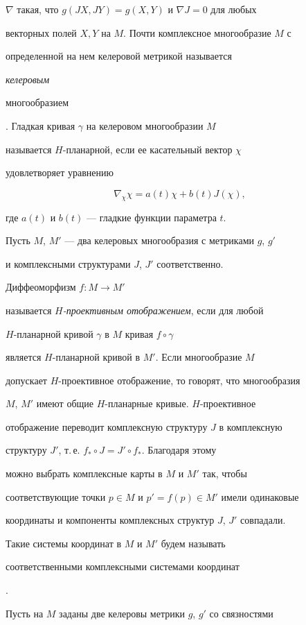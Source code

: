 $\nabla$ такая, что $g(JX,JY)=g(X,Y)$ и $\nabla J=0$ для любых


векторных полей $X,Y$ на $M$. Почти комплексное многообразие $M$ с


определенной на нем келеровой метрикой называется {\it келеровым


многообразием}. Гладкая кривая $\gamma$ на келеровом многообразии $M$


называется $H$-планарной, если ее касательный вектор $\chi$


удовлетворяет уравнению


$$


\nabla_{\chi} \chi = a(t)\chi + b(t) J(\chi),


$$


где $a(t)$ и $b(t)$ --- гладкие функции параметра $t$.





Пусть $M$, $M'$ --- два келеровых многообразия с метриками $g$, $g'$


и комплексными структурами $J$, $J'$ соответственно.


Диффеоморфизм $f: M \to M'$


называется {\it $H$-проективным отображением}, если для любой


$H$-планарной кривой $\gamma$ в $M$ кривая $f\circ \gamma$


является $H$-планарной кривой в $M'$. Если многообразие $M$


допускает $H$-проективное отображение, то говорят, что многообразия


$M$, $M'$ имеют общие $H$-планарные кривые. $H$-проективное


отображение переводит комплексную структуру $J$ в комплексную


структуру $J'$, т.\,е. $f_* \circ J =J' \circ f_*$. Благодаря этому


можно выбрать комплексные карты в $M$ и $M'$ так, чтобы


соответствующие точки $p \in M$ и $p' = f(p) \in M'$ имели одинаковые


координаты и компоненты комплексных структур $J$, $ J'$ совпадали.


Такие системы координат в $M$ и $M'$ будем называть {\it


соответственными комплексными системами координат}.





Пусть на $M$ заданы две келеровы метрики $g$, $g'$ со связностями


